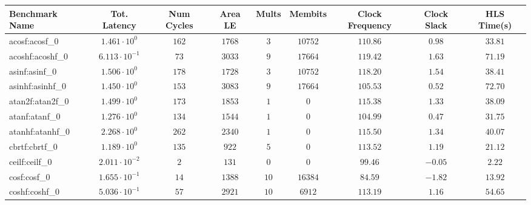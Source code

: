 \begin{tabular}{|l|c|c|c|c|c|c|c|c|}
\hline
Benchmark Name               & Tot. Latency            & Num Cycles & Area LE   & Mults   & Membits    & Clock Frequency & Clock Slack & HLS Time(s) \\
\hline
acosf:acosf\_0               & $ 1.461 \cdot 10^{0}  $ & $ 162    $ & $ 1768  $ & $ 3   $ & $ 10752  $ & $ 110.86      $ & $ 0.98    $ & $ 33.81   $ \\
acoshf:acoshf\_0             & $ 6.113 \cdot 10^{-1} $ & $ 73     $ & $ 3033  $ & $ 9   $ & $ 17664  $ & $ 119.42      $ & $ 1.63    $ & $ 71.19   $ \\
asinf:asinf\_0               & $ 1.506 \cdot 10^{0}  $ & $ 178    $ & $ 1728  $ & $ 3   $ & $ 10752  $ & $ 118.20      $ & $ 1.54    $ & $ 38.41   $ \\
asinhf:asinhf\_0             & $ 1.450 \cdot 10^{0}  $ & $ 153    $ & $ 3083  $ & $ 9   $ & $ 17664  $ & $ 105.53      $ & $ 0.52    $ & $ 72.70   $ \\
atan2f:atan2f\_0             & $ 1.499 \cdot 10^{0}  $ & $ 173    $ & $ 1853  $ & $ 1   $ & $ 0      $ & $ 115.38      $ & $ 1.33    $ & $ 38.09   $ \\
atanf:atanf\_0               & $ 1.276 \cdot 10^{0}  $ & $ 134    $ & $ 1544  $ & $ 1   $ & $ 0      $ & $ 104.99      $ & $ 0.47    $ & $ 31.75   $ \\
atanhf:atanhf\_0             & $ 2.268 \cdot 10^{0}  $ & $ 262    $ & $ 2340  $ & $ 1   $ & $ 0      $ & $ 115.50      $ & $ 1.34    $ & $ 40.07   $ \\
cbrtf:cbrtf\_0               & $ 1.189 \cdot 10^{0}  $ & $ 135    $ & $ 922   $ & $ 5   $ & $ 0      $ & $ 113.52      $ & $ 1.19    $ & $ 21.12   $ \\
ceilf:ceilf\_0               & $ 2.011 \cdot 10^{-2} $ & $ 2      $ & $ 131   $ & $ 0   $ & $ 0      $ & $ 99.46       $ & $ -0.05   $ & $ 2.22    $ \\
cosf:cosf\_0                 & $ 1.655 \cdot 10^{-1} $ & $ 14     $ & $ 1388  $ & $ 10  $ & $ 16384  $ & $ 84.59       $ & $ -1.82   $ & $ 13.92   $ \\
coshf:coshf\_0               & $ 5.036 \cdot 10^{-1} $ & $ 57     $ & $ 2921  $ & $ 10  $ & $ 6912   $ & $ 113.19      $ & $ 1.16    $ & $ 54.65   $ \\

\end{tabular}
